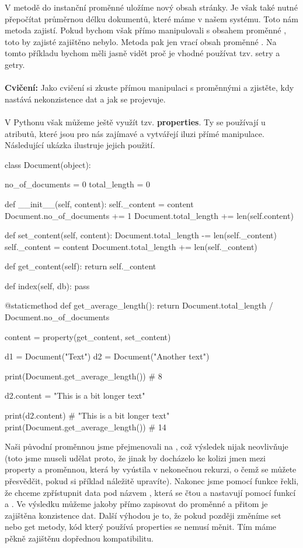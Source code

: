 V metodě  do instanční proměnné  uložíme nový obsah stránky.
Je však také nutné přepočítat průměrnou délku dokumentů, které máme v našem systému. Toto nám metoda
 zajistí. Pokud bychom však přímo manipulovali s obsahem proměnné ,
toto by zajisté zajištěno nebylo. Metoda  pak jen vrací obsah proměnné .
Na tomto příkladu bychom měli jasně vidět proč je vhodné používat tzv. setry a getry.
\\
\\
\noindent
{\textbf{Cvičení:}}
Jako cvičení si zkuste přímou manipulaci s proměnnými a zjistěte, kdy nastává nekonzistence dat a jak
se projevuje.
\\
\\
V Pythonu však můžeme ještě využít tzv. \textbf{properties}. Ty se používají u atributů, které jsou pro
nás zajímavé a vytvářejí iluzi přímé manipulace. Následující ukázka ilustruje jejich použití.

\begin{python}
class Document(object):
    
    no_of_documents = 0
    total_length = 0

    def __init__(self, content):
        self._content = content
        Document.no_of_documents += 1
        Document.total_length += len(self.content)

    def set_content(self, content):
        Document.total_length -= len(self._content)
        self._content = content
        Document.total_length += len(self._content)

    def get_content(self):
        return self._content

    def index(self, db):
        pass

    @staticmethod
    def get_average_length():
        return Document.total_length / Document.no_of_documents

    content = property(get_content, set_content)

d1 = Document("Text")
d2 = Document("Another text")

print(Document.get_average_length()) # 8

d2.content = "This is a bit longer text"

print(d2.content) # "This is a bit longer text"
print(Document.get_average_length()) # 14
\end{python}

Naši původní proměnnou  jsme přejmenovali na , což výsledek nijak neovlivňuje
(toto jsme museli udělat proto, že jinak by docházelo ke kolizi jmen mezi property a proměnnou, která by
vyústila v nekonečnou rekurzi, o čemž se můžete přesvědčit, pokud si příklad náležitě upravíte).
Nakonec jsme pomocí funkce  řekli, že chceme zpřístupnit data pod názvem ,
která se čtou a nastavují pomocí
funkcí  a .
Ve výsledku můžeme jakoby přímo zapisovat do proměnné  a přitom je zajištěna konzistence dat.
Další výhodou je to, že pokud později změníme set nebo get metody, kód který používá properties se nemusí
měnit. Tím máme pěkně zajištěnu dopřednou kompatibilitu.


